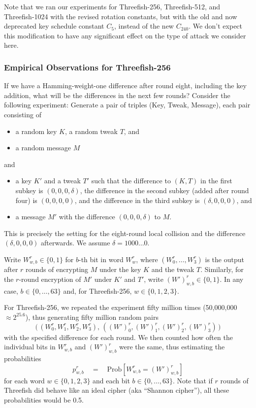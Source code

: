 \documentclass[11pt,twoside]{article}
\newcommand{\TheConst}{C_{240}} %
\begin{document}
Note that we ran our experiments for Threefish-256, Threefish-512, and
Threefish-1024 with the revised rotation constants, but with the old and now
deprecated key schedule constant $C_5$, instead of the new $\TheConst$. We 
don't expect this modification to have any significant effect on the type of
attack we consider here. 


\subsubsection{Empirical Observations for Threefish-256}
  \label{sec:empiric256}

If we have a Hamming-weight-one difference after round eight, including the key addition, what will be the differences in the next few rounds? Consider the following experiment: Generate a pair of triples (Key, Tweak, Message), each pair consisting of 
\begin{itemize}
\item a random key $K$, a random tweak $T$, and
\item a random message $M$
\end{itemize}
and
\begin{itemize}
\item a key $K'$ and a tweak $T'$ such that the difference to $(K,T)$ in the first subkey is $(0,0,0,\delta)$, the difference in the second subkey (added after round four) is $(0,0,0,0)$, and the difference in the third subkey is $(\delta,0,0,0)$, and
\item a message $M'$ with the difference $(0,0,0,\delta)$ to $M$.
\end{itemize}
This is precisely the setting for the eight-round local collision and the difference  $(\delta,0,0,0)$ afterwards. We assume $\delta=1000\ldots0$. 

Write $W^r_{w,b}\in \{0,1\}$ for $b$-th bit in word $W^r_w$, where $(W^r_0, \ldots, W^r_3)$ is the output after $r$ rounds of encrypting $M$ under the key $K$ and the tweak $T$. Similarly, for the $r$-round encryption of $M'$ under $K'$ and $T'$, write $(W')^r_{w,b} \in \{0,1\}$. In any case, $b \in \{0,\ldots, 63\}$ and, for Threefish-256, $w \in \{0, 1,2,3\}$.

For Threefish-256, we repeated the experiment fifty million times (50,000,000 $\approx 2^{25.6}$), thus generating fifty million random pairs
  \[ \bigl(\, (W^r_0,W^r_1,W^r_2,W^r_3),\,
              ((W')^r_0,(W')^r_1,(W')^r_2,(W')^r_3)
     \,\bigr)
  \]
with the specified difference for each round. We then counted how often the individual bits in $W^r_{w,b}$ and $(W')^r_{w,b}$ were the same, thus estimating the probabilities 
     \[ p^r_{w,b} \quad = \quad \mbox{Prob}[W^r_{w,b}=(W')^r_{w,b}] \]
for each word $w \in \{0,1,2,3\}$ and each bit $b \in \{0, \ldots, 63 \}$. Note that if $r$ rounds of Threefish did behave like an ideal cipher (aka ``Shannon cipher''), all these probabilities would be 0.5. 
\end{document}
